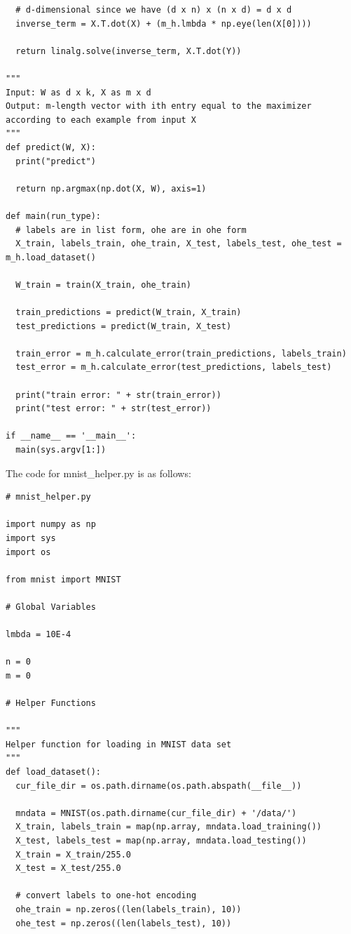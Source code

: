 \documentclass{article}
\newcommand{\1}{\mathbf{1}}
\begin{document}
{\begin{verbatim}
  # d-dimensional since we have (d x n) x (n x d) = d x d
  inverse_term = X.T.dot(X) + (m_h.lmbda * np.eye(len(X[0])))

  return linalg.solve(inverse_term, X.T.dot(Y))

"""
Input: W as d x k, X as m x d
Output: m-length vector with ith entry equal to the maximizer
according to each example from input X
"""
def predict(W, X):
  print("predict")

  return np.argmax(np.dot(X, W), axis=1)

def main(run_type):
  # labels are in list form, ohe are in ohe form
  X_train, labels_train, ohe_train, X_test, labels_test, ohe_test = m_h.load_dataset()

  W_train = train(X_train, ohe_train)
  
  train_predictions = predict(W_train, X_train)
  test_predictions = predict(W_train, X_test)

  train_error = m_h.calculate_error(train_predictions, labels_train)
  test_error = m_h.calculate_error(test_predictions, labels_test)

  print("train error: " + str(train_error))
  print("test error: " + str(test_error))

if __name__ == '__main__':
  main(sys.argv[1:])

\end{verbatim}
The code for mnist\_helper.py is as follows: \\ 

\begin{verbatim}
# mnist_helper.py

import numpy as np
import sys
import os

from mnist import MNIST

# Global Variables

lmbda = 10E-4

n = 0
m = 0

# Helper Functions

"""
Helper function for loading in MNIST data set
"""
def load_dataset():
  cur_file_dir = os.path.dirname(os.path.abspath(__file__))

  mndata = MNIST(os.path.dirname(cur_file_dir) + '/data/')
  X_train, labels_train = map(np.array, mndata.load_training())
  X_test, labels_test = map(np.array, mndata.load_testing())
  X_train = X_train/255.0
  X_test = X_test/255.0

  # convert labels to one-hot encoding
  ohe_train = np.zeros((len(labels_train), 10))
  ohe_test = np.zeros((len(labels_test), 10))


\end{verbatim}}
\end{document}
